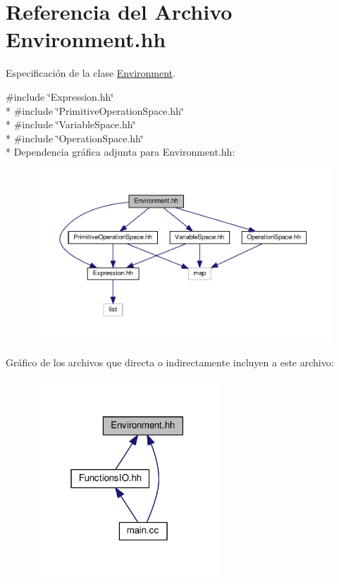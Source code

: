 \hypertarget{_environment_8hh}{}\section{Referencia del Archivo Environment.\+hh}
\label{_environment_8hh}


Especificación de la clase \hyperlink{class_environment}{Environment}.  


{\ttfamily \#include \char`\"{}Expression.\+hh\char`\"{}}\\*
{\ttfamily \#include \char`\"{}Primitive\+Operation\+Space.\+hh\char`\"{}}\\*
{\ttfamily \#include \char`\"{}Variable\+Space.\+hh\char`\"{}}\\*
{\ttfamily \#include \char`\"{}Operation\+Space.\+hh\char`\"{}}\\*
Dependencia gráfica adjunta para Environment.\+hh\+:
\nopagebreak
\begin{figure}[H]
\begin{center}
\leavevmode
\includegraphics[width=350pt]{_environment_8hh__incl}
\end{center}
\end{figure}
Gráfico de los archivos que directa o indirectamente incluyen a este archivo\+:
\nopagebreak
\begin{figure}[H]
\begin{center}
\leavevmode
\includegraphics[width=199pt]{_environment_8hh__dep__incl}
\end{center}
\end{figure}
